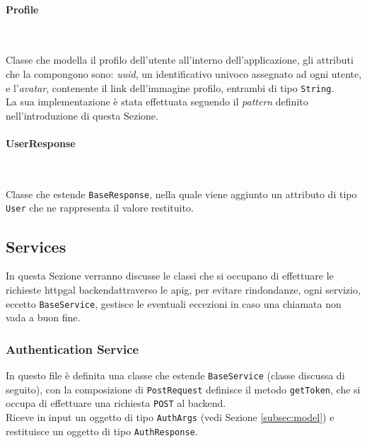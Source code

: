 \paragraph*{Profile} ~ \\
\label{par:profile}

\noindent Classe che modella il profilo dell'utente all'interno dell'applicazione, gli attributi che la compongono sono: \emph{uuid}, un identificativo univoco assegnato ad ogni utente, e l'\emph{avatar}, contenente il link dell'immagine profilo, entrambi di tipo \lstinline{String}. \\
La sua implementazione è stata effettuata seguendo il \emph{pattern} definito nell'introduzione di questa Sezione.

\paragraph*{UserResponse} ~ \\
\label{par:user-response}

\noindent Classe che estende \lstinline{BaseResponse}, nella quale viene aggiunto un attributo di tipo \lstinline{User} che ne rappresenta il valore restituito.

\subsection{Services}
\label{subsec:services}

In questa Sezione verranno discusse le classi che si occupano di effettuare le richieste \gls{httpg}\glsoccur al \gls{backend}\glsoccur attraverso le \gls{apig}\glsoccur, per evitare rindondanze, ogni servizio, eccetto \lstinline{BaseService}, gestisce le eventuali eccezioni in caso una chiamata non vada a buon fine.

\subsubsection*{Authentication Service}
\label{subsubsec:authentication-service}

In questo file è definita una classe che estende \lstinline{BaseService} (classe discussa di seguito), con la composizione di \lstinline{PostRequest} definisce il metodo \lstinline{getToken}, che si occupa di effettuare una richiesta \lstinline{POST} al \gls{backend}\glsoccur. \\
Riceve in input un oggetto di tipo \lstinline{AuthArgs} (vedi Sezione \ref{subsec:model}) e restituisce un oggetto di tipo \lstinline{AuthResponse}.

